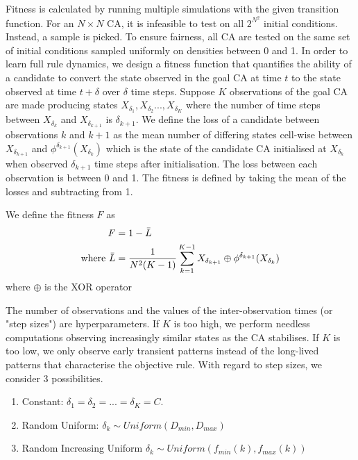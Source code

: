 Fitness is calculated by running multiple simulations with the given transition function. For an $N \times N$ CA, it is infeasible to test on all $2^{N^2}$ initial conditions. Instead, a sample is picked. To ensure fairness, all CA are tested on the same set of initial conditions sampled uniformly on densities between 0 and 1. In order to learn full rule dynamics, we design a fitness function that quantifies the ability of a candidate to convert the state observed in the goal CA at time $t$ to the state observed at time $t+\delta$ over $\delta$ time steps. Suppose $K$ observations of the goal CA are made producing states $X_{\delta_1}, X_{\delta_2} ..., X_{\delta_K}$ where the number of time steps between $X_{\delta_k}$ and $X_{\delta_{k+1}}$ is $\delta_{k+1}$. We define the loss of a candidate between observations $k$ and $k+1$ as the mean number of differing states cell-wise between $X_{\delta_{k+1}}$ and $\phi^{\delta_{k+1}}(X_{\delta_k})$ which is the state of the candidate CA initialised at $X_{\delta_k}$ when observed $\delta_{k+1}$ time steps after initialisation. The loss between each observation is between 0 and 1. The fitness is defined by taking the mean of the losses and subtracting from 1.

\begin{definition}
We define the fitness $F$ as
\begin{align*}
    F &= 1 - \bar{L}\\
    \textnormal{where\ } \bar{L} &= \frac{1}{N^2(K-1)}\sum_{k=1}^{K-1} X_{\delta_{k+1}} \oplus \phi^{\delta_{k+1}}(X_{\delta_k})
\end{align*}
where $\oplus$ is the XOR operator
\end{definition}

The number of observations and the values of the inter-observation times (or "step sizes") are hyperparameters. If $K$ is too high, we perform needless computations observing increasingly similar states as the CA stabilises. If $K$ is too low, we only observe early transient patterns instead of the long-lived patterns that characterise the objective rule. With regard to step sizes, we consider 3 possibilities.

\begin{enumerate}
    \item Constant: $\delta_1 = \delta_2 = ... = \delta_K = C$.
    \item Random Uniform: $\delta_k \sim \mathit{Uniform}(D_{min}, D_{max})$
    \item Random Increasing Uniform $\delta_k \sim \mathit{Uniform}(f_{min}(k), f_{max}(k))$
\end{enumerate}

